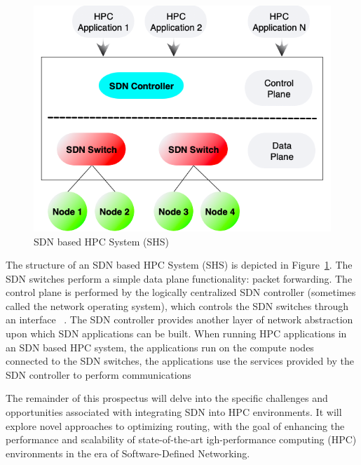\begin{figure}[h]
  \centering
  \includegraphics[width=\columnwidth]{./figs/sdn_in_hpc.png}
  \caption{SDN based HPC System (SHS)}
  \label{fig:sdn_hpc}
\end{figure}

The structure of an SDN based HPC System (SHS) is depicted in Figure~\ref{fig:sdn_hpc}.
The SDN switches perform a simple data plane functionality: packet forwarding. The
control plane is performed by the logically centralized
SDN controller (sometimes called the network operating system), which controls
the SDN switches through an interface ~\cite{benzekki2016software}.
The SDN controller provides another layer of network abstraction upon which SDN
applications can be built. When running HPC applications in an SDN based HPC system,
the applications run on the compute nodes connected to the SDN switches,
the applications use the services provided by the SDN controller to perform
communications



The remainder of this prospectus will delve into the specific challenges and opportunities associated with integrating SDN into HPC environments. It will explore novel approaches to optimizing routing, with the goal of enhancing the performance and scalability of state-of-the-art igh-performance computing (HPC) environments in the era of Software-Defined Networking.

